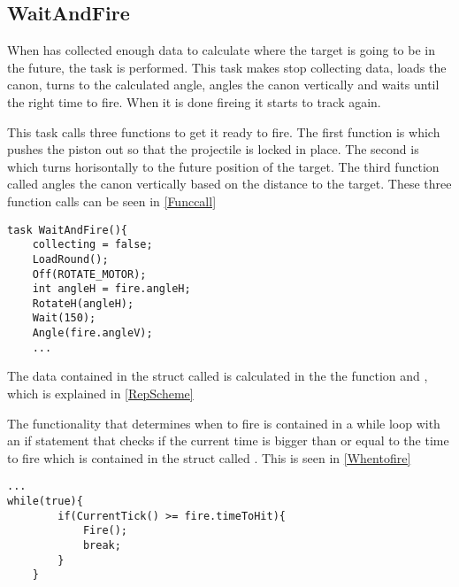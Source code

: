 \subsection{WaitAndFire}
When \name has collected enough data to calculate where the target is going to
be in the future, the task  is performed. This task makes
\name stop collecting data, loads the canon, turns to the calculated angle, angles the
canon vertically and waits until the right time to fire. When it is done fireing
it starts to track again.\nl

This task calls three functions to get it ready to fire. The first function is
 which pushes the piston out so that the projectile is locked
in place. The second is  which turns \name horisontally to the
future position of the target. The third function called  angles
the canon vertically based on the distance to the target. These three function calls can be seen in
\autoref{Funccall}\nl

\begin{minipage}[H]{\linewidth}
\begin{lstlisting}[caption = Function calls in WaitAndFire, label = Funccall,
style = nc] 
task WaitAndFire(){
    collecting = false;
    LoadRound();
    Off(ROTATE_MOTOR);
    int angleH = fire.angleH;
    RotateH(angleH);
    Wait(150);
    Angle(fire.angleV);
    ...
\end{lstlisting}
\end{minipage}

The data contained in the struct called  is calculated in the the
function  and , which is explained in
\autoref{RepScheme}

The functionality that determines when to fire is contained in a while loop with
an if statement that checks if the current time is bigger than or equal to the
time to fire which is contained in the struct called . This is seen
in \autoref{Whentofire}\nl
 
\begin{minipage}[H]{\linewidth}
\begin{lstlisting}[caption = While loop that determines when to fire, label =
Whentofire, style = nc] ...
while(true){
        if(CurrentTick() >= fire.timeToHit){
            Fire();
            break;
        }
    }
\end{lstlisting}
\end{minipage}





